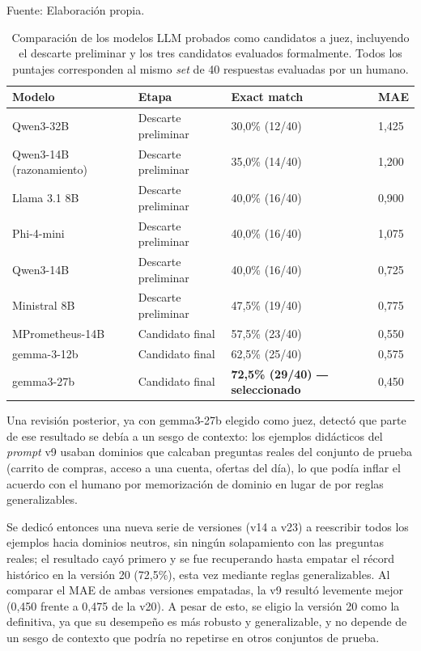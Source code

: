 \begin{table}[h]
    \centering
    \caption{\label{table:juecescandidatos} Comparación de los modelos LLM probados como candidatos a juez, incluyendo el descarte preliminar y los tres candidatos evaluados formalmente. Todos los puntajes corresponden al mismo \textit{set} de 40 respuestas evaluadas por un humano.} Fuente: Elaboración propia.
    \begin{tabular}{|p{4cm}|p{3.3cm}|p{3.2cm}|p{2cm}|}
        \hline
        \textbf{Modelo} & \textbf{Etapa} & \textbf{Exact match} & \textbf{MAE} \\
        \hline
        Qwen3-32B & Descarte preliminar & 30,0\% (12/40) & 1,425 \\
        \hline
        Qwen3-14B (razonamiento) & Descarte preliminar & 35,0\% (14/40) & 1,200 \\
        \hline
        Llama 3.1 8B & Descarte preliminar & 40,0\% (16/40) & 0,900 \\
        \hline
        Phi-4-mini & Descarte preliminar & 40,0\% (16/40) & 1,075 \\
        \hline
        Qwen3-14B & Descarte preliminar & 40,0\% (16/40) & 0,725 \\
        \hline
        Ministral 8B & Descarte preliminar & 47,5\% (19/40) & 0,775 \\
        \hline
        MPrometheus-14B & Candidato final & 57,5\% (23/40) & 0,550 \\
        \hline
        gemma-3-12b & Candidato final & 62,5\% (25/40) & 0,575 \\
        \hline
        gemma3-27b & Candidato final & \textbf{72,5\% (29/40) ― seleccionado} & 0,450 \\
        \hline
    \end{tabular}
\end{table}

Una revisión posterior, ya con gemma3-27b elegido como juez, detectó que parte de ese resultado se debía a un sesgo de contexto: los ejemplos didácticos del \textit{prompt} v9 usaban dominios que calcaban preguntas reales del conjunto de prueba (carrito de compras, acceso a una cuenta, ofertas del día), lo que podía inflar el acuerdo con el humano por memorización de dominio en lugar de por reglas generalizables.

Se dedicó entonces una nueva serie de versiones (v14 a v23) a reescribir todos los ejemplos hacia dominios neutros, sin ningún solapamiento con las preguntas reales; el resultado cayó primero y se fue recuperando hasta empatar el récord histórico en la versión 20 (72,5\%), esta vez mediante reglas generalizables. Al comparar el MAE de ambas versiones empatadas, la v9 resultó levemente mejor (0,450 frente a 0,475 de la v20). A pesar de esto, se eligio la versión 20 como la definitiva, ya que su desempeño es más robusto y generalizable, y no depende de un sesgo de contexto que podría no repetirse en otros conjuntos de prueba.

